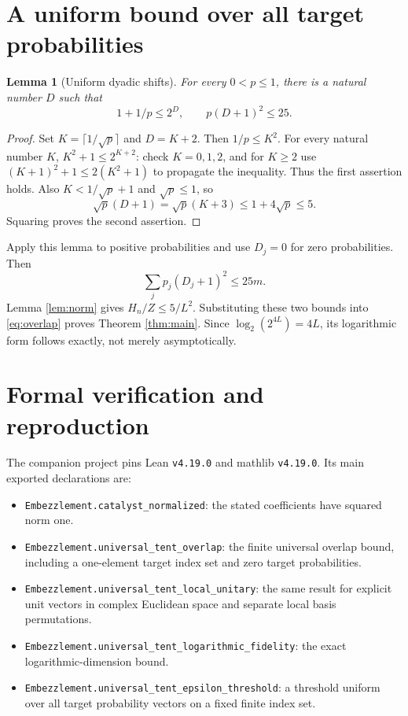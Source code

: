 \documentclass[11pt]{article}
\newtheorem{lemma}[theorem]{Lemma}
\begin{document}
\section{A uniform bound over all target probabilities}

\begin{lemma}[Uniform dyadic shifts]\label{lem:shift}
For every $0<p\leq1$, there is a natural number $D$ such that
\[
 1+1/p\leq2^D,\qquad p(D+1)^2\leq25.
\]
\end{lemma}
\begin{proof}
Set $K=\lceil1/\sqrt p\rceil$ and $D=K+2$. Then $1/p\leq K^2$. For every natural number $K$, $K^2+1\leq2^{K+2}$: check $K=0,1,2$, and for $K\geq2$ use $(K+1)^2+1\leq2(K^2+1)$ to propagate the inequality. Thus the first assertion holds. Also $K<1/\sqrt p+1$ and $\sqrt p\leq1$, so
\[
 \sqrt p(D+1)=\sqrt p(K+3)\leq1+4\sqrt p\leq5.
\]
Squaring proves the second assertion.
\end{proof}

Apply this lemma to positive probabilities and use $D_j=0$ for zero probabilities. Then
\[
 \sum_jp_j(D_j+1)^2\leq25m.
\]
Lemma \ref{lem:norm} gives $H_n/Z\leq5/L^2$. Substituting these two bounds into \eqref{eq:overlap} proves Theorem \ref{thm:main}. Since $\log_2(2^{4L})=4L$, its logarithmic form follows exactly, not merely asymptotically.

\section{Formal verification and reproduction}

The companion project pins Lean \texttt{v4.19.0} and mathlib \texttt{v4.19.0}. Its main exported declarations are:
\begin{itemize}[leftmargin=1.5em,itemsep=2pt]
\item {\small\texttt{Embezzlement.catalyst\_normalized}}: the stated coefficients have squared norm one.
\item {\small\texttt{Embezzlement.universal\_tent\_overlap}}: the finite universal overlap bound, including a one-element target index set and zero target probabilities.
\item {\small\texttt{Embezzlement.universal\_tent\_local\_unitary}}: the same result for explicit unit vectors in complex Euclidean space and separate local basis permutations.
\item {\small\texttt{Embezzlement.universal\_tent\_logarithmic\_fidelity}}: the exact logarithmic-dimension bound.
\item {\small\texttt{Embezzlement.universal\_tent\_epsilon\_threshold}}: a threshold uniform over all target probability vectors on a fixed finite index set.
\end{itemize}
\end{document}
